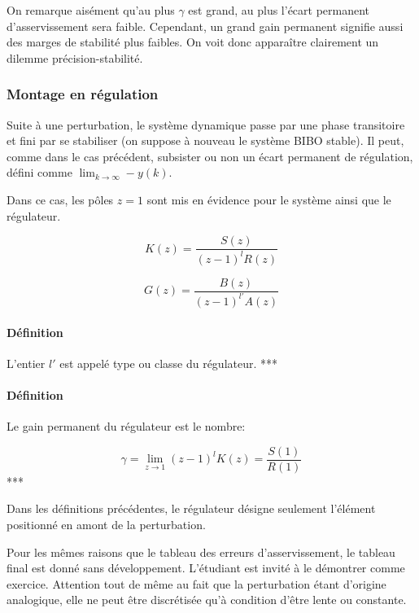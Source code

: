 \documentclass[11pt]{article}
\begin{document}
    On remarque aisément qu'au plus \(\gamma\) est grand, au plus l'écart
permanent d'asservissement sera faible. Cependant, un grand gain
permanent signifie aussi des marges de stabilité plus faibles. On voit
donc apparaître clairement un dilemme précision-stabilité.

    \subsubsection{Montage en régulation}\label{montage-en-ruxe9gulation}

    Suite à une perturbation, le système dynamique passe par une phase
transitoire et fini par se stabiliser (on suppose à nouveau le système
BIBO stable). Il peut, comme dans le cas précédent, subsister ou non un
écart permanent de régulation, défini comme
\(\lim_{k \rightarrow \infty} -y(k)\).

    Dans ce cas, les pôles \(z=1\) sont mis en évidence pour le système
ainsi que le régulateur.

    \[ K(z) = \frac{S(z)}{(z-1)^l R(z)} \]

\[ G(z) = \frac{B(z)}{(z-1)^{l'} A(z)} \]

    \paragraph{Définition}\label{duxe9finition}

L'entier \(l'\) est appelé type ou classe du régulateur. ***

    \paragraph{Définition}\label{duxe9finition}

Le gain permanent du régulateur est le nombre:

\[ \gamma = \lim_{z \rightarrow 1} (z-1)^l K(z) = \frac{S(1)}{R(1)} \]
***

    Dans les définitions précédentes, le régulateur désigne seulement
l'élément positionné en amont de la perturbation.

    Pour les mêmes raisons que le tableau des erreurs d'asservissement, le
tableau final est donné sans développement. L'étudiant est invité à le
démontrer comme exercice. Attention tout de même au fait que la
perturbation étant d'origine analogique, elle ne peut être discrétisée
qu'à condition d'être lente ou constante.
\end{document}
